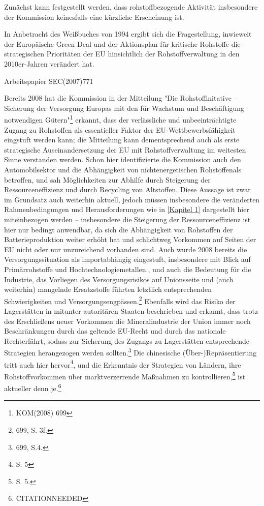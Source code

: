 \documentclass[12pt,a4paper,oneside]{book} %
\begin{document}
Zunächst kann festgestellt werden, dass rohstoffbezogende Aktivität insbesondere der Kommission keinesfalls eine kürzliche Erscheinung ist.

In Anbetracht des Weißbuches von 1994 ergibt sich die Fragestellung, inwieweit der Europäische Green Deal und der Aktionsplan für kritische Rohstoffe die strategischen Prioritäten der EU hinsichtlich der Rohstoffverwaltung in den 2010er-Jahren verändert hat.
	
Arbeitspapier SEC(2007)771
	
Bereits 2008 hat die Kommission in der Mitteilung "Die Rohstoffinitative -- Sicherung der Versorgung Europas mit den für Wachstum und Beschäftigung notwendigen Gütern"\footnote{KOM(2008) 699} erkannt, dass der verlässliche und unbeeinträchtigte Zugang zu Rohstoffen als essentieller Faktor der EU-Wettbewerbsfähigkeit eingstuft werden kann; die Mitteilung kann dementsprechend auch als erste strategische Auseinandersetzung der EU mit Rohstoffverwaltung im weitesten Sinne verstanden werden. Schon hier identifizierte die Kommission auch den Automobilsektor und die Abhängigkeit von \glqq nichtenergetischen Rohstoffen\grqq als betroffen, und sah Möglichkeiten zur Abhilfe \glqq durch Steigerung der Ressourceneffizienz und durch Recycling von Altstoffen\grqq. Diese Aussage ist zwar im Grundsatz auch weiterhin aktuell, jedoch müssen insbesondere die veränderten Rahmenbedingungen und Herausforderungen wie in \ref{Kapitel 1} dargestellt hier miteinbezogen werden -- insbesondere die Steigerung der Ressourceneffizienz ist hier nur bedingt anwendbar, da sich die Abhängigkeit von Rohstoffen der Batterieproduktion weiter erhöht hat und schlichtweg Vorkommen auf Seiten der EU nicht oder nur unzureichend vorhanden sind. Auch wurde 2008 bereits die Versorgungssituation als importabhängig eingestuft, insbesondere mit Blick auf Primärrohstoffe und \glqq Hochtechnologiemetallen\grqq., und auch die Bedeutung für die Industrie, das Vorliegen des Versorgungsrisikos auf Unionsseite und (auch weiterhin) mangelnde Ersatzstoffe führten letztlich entsprechenden Schwierigkeiten und Versorgungsengpässen.\footnote{699, S. 3f.} Ebenfalls wird das Risiko der Lagerstätten in mitunter autoritären Staaten beschrieben und erkannt, dass trotz des Erschließens neuer Vorkommen die Mineralindustrie der Union \glqq immer noch Beschränkungen durch das geltende EU-Recht und durch das nationale Recht\grqq erfährt, sodass zur Sicherung des Zugangs zu Lagerstätten entsprechende Strategien herangezogen werden sollten.\footnote{699, S.4.} Die chinesische (Über-)Repräsentierung tritt auch hier hervor\footnote{S. 5}, und die Erkenntnis der Strategien von Ländern, ihre Rohstoffvorkommen über marktverzerrende Maßnahmen zu kontrollieren,\footnote{S. 5.} ist aktueller denn je.\footnote{CITATIONNEEDED}
\end{document}
